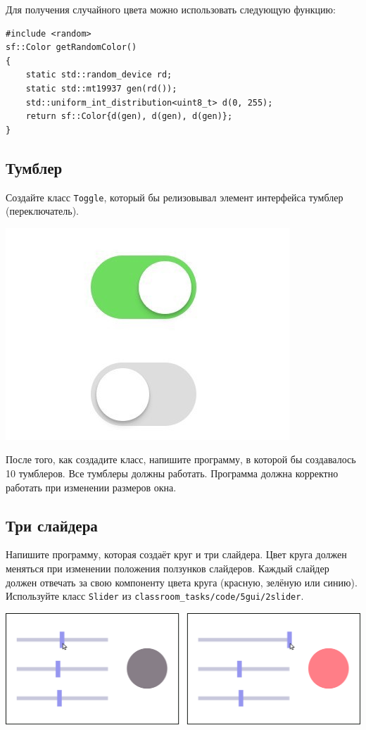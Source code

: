 \documentclass{article}
\begin{document}
Для получения случайного цвета можно использовать следующую функцию:
\begin{lstlisting}
#include <random>
sf::Color getRandomColor()
{
    static std::random_device rd;
    static std::mt19937 gen(rd());
    std::uniform_int_distribution<uint8_t> d(0, 255);
    return sf::Color{d(gen), d(gen), d(gen)};
}
\end{lstlisting}


\subsection{Тумблер}
Создайте класс \texttt{Toggle}, который бы релизовывал элемент интерфейса тумблер (переключатель).
\begin{center}
\includegraphics[scale=0.25]{../images/toggle_button.jpeg}
\end{center}
После того, как создадите класс, напишите программу, в которой бы создавалось 10 тумблеров. Все тумблеры должны работать. Программа должна корректно работать при изменении размеров окна.


\subsection{Три слайдера}
Напишите программу, которая создаёт круг и три слайдера. Цвет круга должен меняться при изменении положения ползунков слайдеров. Каждый слайдер должен отвечать за свою компоненту цвета круга (красную, зелёную или синию). Используйте класс \texttt{Slider} из \texttt{classroom\_tasks/code/5gui/2slider}.
\begin{center}
\includegraphics[scale=0.95]{../images/slider_chose_color.png}
\end{center}
\end{document}
